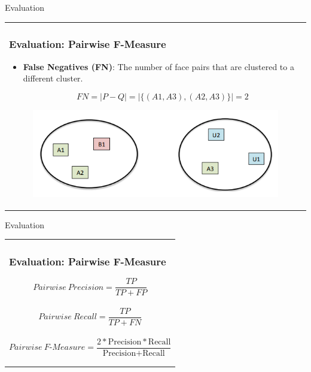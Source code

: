 \documentclass[11pt]{beamer}
\begin{document}
\begin{frame}{Evaluation}
\begin{tabular}{l}
\parbox{1\linewidth}{
\frametitle{Evaluation: Pairwise F-Measure}
\begin{itemize}
\item \textbf{False Negatives (FN)}: The number of face pairs that are clustered to a different cluster.

$$FN = |P - Q| = |\{(A1, A3), (A2, A3)\}| = 2$$

\end{itemize}

\begin{figure}[!tbp]
 \centering
    \includegraphics[width=0.8\columnwidth]{figures/fmeasure.png}
    \label{fig:fmeasure}
\end{figure}
}
\end{tabular}  
\end{frame}

\begin{frame}{Evaluation}
\begin{tabular}{l}
\parbox{1\linewidth}{
\frametitle{Evaluation: Pairwise F-Measure}

$$ Pairwise \ Precision = \frac{TP}{TP + FP}$$
\\
$$ Pairwise \ Recall = \frac{TP}{TP + FN}$$
\\
$$Pairwise \ F\textrm{-}Measure = \frac{2 * \textrm{Precision}*\textrm{Recall}}{\textrm{Precision} + \textrm{Recall}}$$

}
\end{tabular}  
\end{frame}
\end{document}
